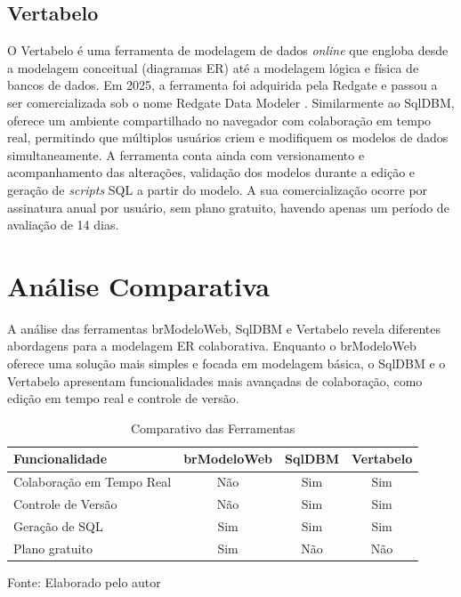 \subsection[Vertabelo]{Vertabelo}

O Vertabelo é uma ferramenta de modelagem de dados \textit{online} que engloba desde a modelagem conceitual (diagramas ER) até a modelagem lógica e física de bancos de dados. Em 2025, a ferramenta foi adquirida pela Redgate e passou a ser comercializada sob o nome Redgate Data Modeler \cite{Vertabelo2026}. Similarmente ao SqlDBM, oferece um ambiente compartilhado no navegador com colaboração em tempo real, permitindo que múltiplos usuários criem e modifiquem os modelos de dados simultaneamente. A ferramenta conta ainda com versionamento e acompanhamento das alterações, validação dos modelos durante a edição e geração de \textit{scripts} SQL a partir do modelo. A sua comercialização ocorre por assinatura anual por usuário, sem plano gratuito, havendo apenas um período de avaliação de 14 dias.

\section[Análise Comparativa]{Análise Comparativa}

A análise das ferramentas brModeloWeb, SqlDBM e Vertabelo revela diferentes abordagens para a modelagem ER colaborativa. Enquanto o brModeloWeb oferece uma solução mais simples e focada em modelagem básica, o SqlDBM e o Vertabelo apresentam funcionalidades mais avançadas de colaboração, como edição em tempo real e controle de versão.

\begin{table}[H]
    \centering
    \renewcommand{\arraystretch}{1.5}
    \caption{Comparativo das Ferramentas}
    \label{tabela:comparativo-ferramentas}
        \begin{tabulary}{\textwidth}{|L|C|C|C|}
        \hline
        \textbf{Funcionalidade} & \textbf{brModeloWeb} & \textbf{SqlDBM} & \textbf{Vertabelo} \\
        \hline
        Colaboração em Tempo Real & Não & Sim & Sim \\
        \hline
        Controle de Versão & Não & Sim & Sim \\
        \hline
        Geração de SQL & Sim & Sim & Sim \\
        \hline
        Plano gratuito & Sim & Não & Não \\
        \hline
        \end{tabulary}
    \begin{center}
        {\small Fonte: Elaborado pelo autor}
    \end{center}
\end{table}
